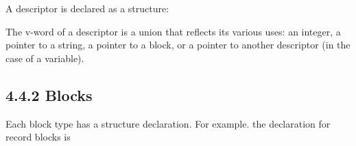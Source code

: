 A descriptor is declared as a structure:


The v-word of a descriptor is a union that reflects its various uses:
an integer, a pointer to a string, a pointer to a block, or a pointer
to another descriptor (in the case of a variable).

\subsection[4.4.2 Blocks]{4.4.2 Blocks}

Each block type has a structure declaration. For example. the
declaration for record blocks is

